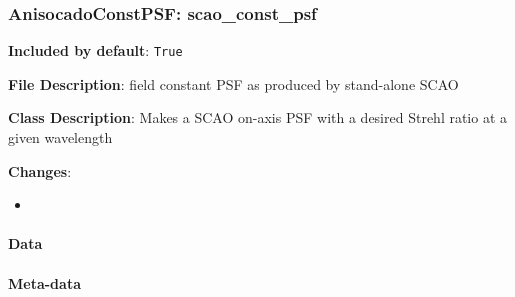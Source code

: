 \subsubsection{AnisocadoConstPSF: \textquotedbl{}scao\_const\_psf\textquotedbl{}%
  \label{anisocadoconstpsf-scao-const-psf}%
}

\textbf{Included by default}: \texttt{True}

\textbf{File Description}: field constant PSF as produced by stand-alone SCAO

\textbf{Class Description}: Makes a SCAO on-axis PSF with a desired Strehl ratio at a given wavelength

\textbf{Changes}:

\begin{itemize}
\item \end{itemize}


\paragraph{Data%
  \label{id1}%
}

\begin{figure}[H]
\noindent{}\label{fig-scao-const-psf}
\end{figure}


\paragraph{Meta-data%
  \label{id2}%
}

